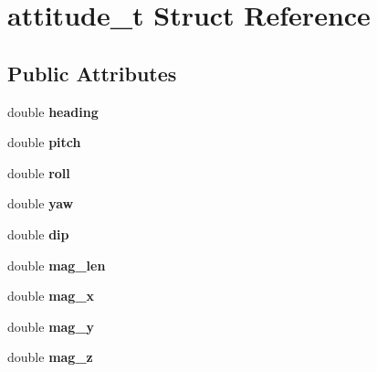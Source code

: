 \hypertarget{structattitude__t}{\section{attitude\-\_\-t \-Struct \-Reference}
\label{structattitude__t}
}
\subsection*{\-Public \-Attributes}
\begin{DoxyCompactItemize}
\item 
\hypertarget{structattitude__t_a5a839016d2602bc41d868d76aeaa0b51}{double {\bfseries heading}}\label{structattitude__t_a5a839016d2602bc41d868d76aeaa0b51}

\item 
\hypertarget{structattitude__t_a5ebde1bfe2f839c12fe302ea19384fb2}{double {\bfseries pitch}}\label{structattitude__t_a5ebde1bfe2f839c12fe302ea19384fb2}

\item 
\hypertarget{structattitude__t_a37f03eb650cb75e2de293e47641806bb}{double {\bfseries roll}}\label{structattitude__t_a37f03eb650cb75e2de293e47641806bb}

\item 
\hypertarget{structattitude__t_ad5d4958450c7f0e52264ee88534984fd}{double {\bfseries yaw}}\label{structattitude__t_ad5d4958450c7f0e52264ee88534984fd}

\item 
\hypertarget{structattitude__t_a965692195da5ec947c129cdfac26ad18}{double {\bfseries dip}}\label{structattitude__t_a965692195da5ec947c129cdfac26ad18}

\item 
\hypertarget{structattitude__t_aaa3374cacbefea74fa628a4a8369ff74}{double {\bfseries mag\-\_\-len}}\label{structattitude__t_aaa3374cacbefea74fa628a4a8369ff74}

\item 
\hypertarget{structattitude__t_ae9c398a5f1f23918ec3a743a3a533f6a}{double {\bfseries mag\-\_\-x}}\label{structattitude__t_ae9c398a5f1f23918ec3a743a3a533f6a}

\item 
\hypertarget{structattitude__t_af305e3d8cc69ca33085d5baac2f2aff4}{double {\bfseries mag\-\_\-y}}\label{structattitude__t_af305e3d8cc69ca33085d5baac2f2aff4}

\item 
\hypertarget{structattitude__t_a2a5e24be5b77a0a758056c5ffe174c10}{double {\bfseries mag\-\_\-z}}\label{structattitude__t_a2a5e24be5b77a0a758056c5ffe174c10}


\end{DoxyCompactItemize}
